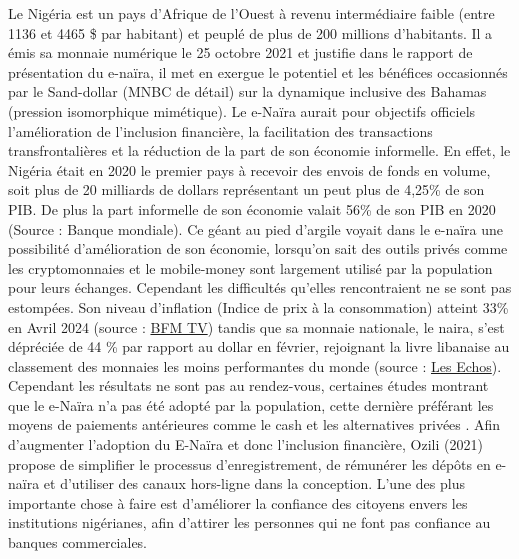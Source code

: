 \documentclass[12pt]{article}
\begin{document}
Le Nigéria est un pays d'Afrique de l'Ouest à revenu intermédiaire faible (entre 1136 et 4465 \$ par habitant) et peuplé de plus de 200 millions d'habitants. Il a émis sa monnaie numérique le 25 octobre 2021 et justifie dans le rapport de présentation du e-naïra, il met en exergue le potentiel et les bénéfices occasionnés par le Sand-dollar (MNBC de détail) sur la dynamique inclusive des Bahamas (pression isomorphique mimétique). Le e-Naïra aurait pour objectifs officiels l'amélioration de l'inclusion financière, la facilitation des transactions transfrontalières et la réduction de la part de son économie informelle. En effet, le Nigéria était en 2020 le premier pays à recevoir des envois de fonds en volume, soit plus de 20 milliards de dollars représentant un peut plus de 4,25\% de son PIB. De plus la part informelle de son économie valait 56\% de son PIB en 2020 (Source : Banque mondiale). Ce géant au pied d'argile voyait dans le e-naïra une possibilité d'amélioration de son économie, lorsqu'on sait des outils privés comme les cryptomonnaies et le mobile-money sont largement utilisé par la population pour leurs échanges. Cependant les difficultés qu'elles rencontraient ne se sont pas estompées. Son niveau d'inflation (Indice de prix à la consommation) atteint 33\% en Avril 2024 (source : \href{https://www.bfmtv.com/economie/international/nigeria-l-inflation-galope-et-atteint-33-dans-un-pays-en-proie-a-l-insecurite-alimentaire_AN-202404150593.html#:~:text=International-,Nigeria%3A%20l'inflation%20galope%20et%20atteint%2033%25%20dans%20un,proie%20à%20l'insécurité%20alimentaire&text=L'inflation%20grimpe%20son%20niveau,le%20plus%20peuplé%20d'Afrique.}{BFM TV}) tandis que sa monnaie nationale, le naira, s'est dépréciée de 44 \% par rapport au dollar en février, rejoignant la livre libanaise au classement des monnaies les moins performantes du monde (source : \href{https://www.lesechos.fr/finance-marches/marches-financiers/confronte-a-leffondrement-de-sa-monnaie-le-nigeria-sattaque-aux-plateformes-de-cryptos-et-de-devises-2079633#:~:text=La%20monnaie%20nigériane%20est%20en,les%20moins%20performantes%20du%20monde.}{Les Echos}). Cependant les résultats ne sont pas au rendez-vous, certaines études montrant que le e-Naïra n'a pas été adopté par la population, cette dernière préférant les moyens de paiements antérieures comme le cash et les alternatives privées \cite{Ozili2021Central}. Afin d'augmenter l'adoption du E-Naïra et donc l'inclusion financière, Ozili (2021) propose de simplifier le processus d'enregistrement, de rémunérer les dépôts en e-naïra et d'utiliser des canaux hors-ligne dans la conception. L'une des plus importante chose à faire est d'améliorer la confiance des citoyens envers les institutions nigérianes, afin d'attirer les personnes qui ne font pas confiance au banques commerciales.
\end{document}
